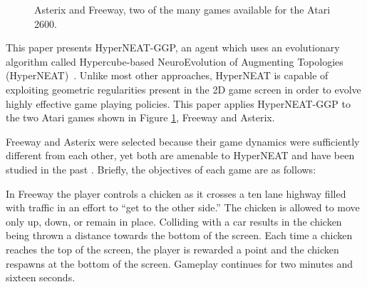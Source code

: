 \documentclass{sig-alternate}
\begin{document}
\begin{figure}[t]
  \centering
  \hspace{.1in}
  \hspace{.1in}
 \caption{Asterix and Freeway, two of the many games available for the Atari 2600.}
 \label{fig:samplegames}
\end{figure}

This paper presents HyperNEAT-GGP, an agent which uses an evolutionary algorithm called Hypercube-based NeuroEvolution of Augmenting Topologies (HyperNEAT)~\cite{gauci08}. Unlike most other approaches, HyperNEAT is capable of exploiting geometric regularities present in the 2D game screen in order to evolve highly effective game playing policies. This paper applies HyperNEAT-GGP to the two Atari games shown in Figure \ref{fig:samplegames}, Freeway and Asterix.

Freeway and Asterix were selected because their game dynamics were sufficiently different from each other, yet both are amenable to HyperNEAT and have been studied in the past \cite{naddaf10}. Briefly, the objectives of each game are as follows:

In Freeway the player controls a chicken as it crosses a ten lane highway filled with traffic in an effort to ``get to the other side.'' The chicken is allowed to move only up, down, or remain in place. Colliding with a car results in the chicken being thrown a distance towards the bottom of the screen. Each time a chicken reaches the top of the screen, the player is rewarded a point and the chicken respawns at the bottom of the screen. Gameplay continues for two minutes and sixteen seconds. 
\end{document}
